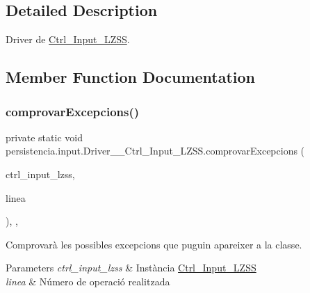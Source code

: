 \subsection{Detailed Description}
Driver de \hyperlink{classpersistencia_1_1input_1_1Ctrl__Input__LZSS}{Ctrl\+\_\+\+Input\+\_\+\+L\+Z\+SS}. 

\subsection{Member Function Documentation}
\mbox{\label{classpersistencia_1_1input_1_1Driver____Ctrl__Input__LZSS_a221f978664fc97bdab3b18d3c5f55155}} 
\subsubsection{\texorpdfstring{comprovar\+Excepcions()}{comprovarExcepcions()}}
{\footnotesize\ttfamily private static void persistencia.\+input.\+Driver\+\_\+\+\_\+\+Ctrl\+\_\+\+Input\+\_\+\+L\+Z\+S\+S.\+comprovar\+Excepcions (\begin{DoxyParamCaption}\item[{\hyperlink{classpersistencia_1_1input_1_1Ctrl__Input__LZSS}{Ctrl\+\_\+\+Input\+\_\+\+L\+Z\+SS}}]{ctrl\+\_\+input\+\_\+lzss,  }\item[{String}]{linea }\end{DoxyParamCaption})\hspace{0.3cm}{\ttfamily [inline]}, {\ttfamily [static]}, {\ttfamily [private]}}



Comprovarà les possibles excepcions que puguin apareixer a la classe. 


\begin{DoxyParams}{Parameters}
{\em ctrl\+\_\+input\+\_\+lzss} & Instància \hyperlink{classpersistencia_1_1input_1_1Ctrl__Input__LZSS}{Ctrl\+\_\+\+Input\+\_\+\+L\+Z\+SS} \\
\hline
{\em linea} & Número de operació realitzada \\
\hline
\end{DoxyParams}

